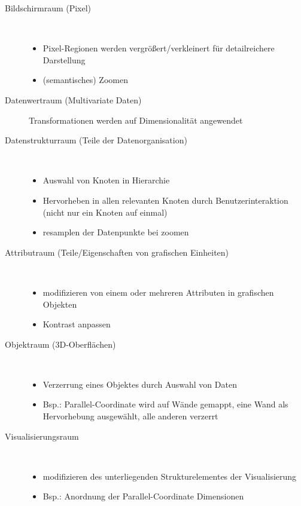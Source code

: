 \begin{description}
	\item[Bildschirmraum (Pixel)] \ \\\vspace*{-\baselineskip}
		\begin{itemize}
			\item Pixel-Regionen werden vergrößert/verkleinert für detailreichere Darstellung
			\item (semantisches) Zoomen
		\end{itemize}
	\item[Datenwertraum (Multivariate Daten)] Transformationen werden auf Dimensionalität angewendet
	\item[Datenstrukturraum (Teile der Datenorganisation)] \ \\\vspace*{-\baselineskip}
		\begin{itemize}
			\item Auswahl von Knoten in Hierarchie
			\item Hervorheben in allen relevanten Knoten durch Benutzerinteraktion (nicht nur ein Knoten auf einmal)
			\item resamplen der Datenpunkte bei zoomen
		\end{itemize}
	\item[Attributraum (Teile/Eigenschaften von grafischen Einheiten)] \ \\\vspace*{-\baselineskip}
		\begin{itemize}
			\item modifizieren von einem oder mehreren Attributen in grafischen Objekten
			\item Kontrast anpassen
		\end{itemize}
\end{description}
\topbreak
\vspace*{-\baselineskip}
\begin{description}
	\item[Objektraum (3D-Oberflächen)] \ \\\vspace*{-\baselineskip}
		\begin{itemize}
			\item Verzerrung eines Objektes durch Auswahl von Daten
			\item Bsp.: Parallel-Coordinate wird auf Wände gemappt, eine Wand als Hervorhebung ausgewählt, alle anderen verzerrt
		\end{itemize}
	\item[Visualisierungsraum] \ \\\vspace*{-\baselineskip}
		\begin{itemize}
			\item modifizieren des unterliegenden Strukturelementes der Visualisierung
			\item Bsp.: Anordnung der Parallel-Coordinate Dimensionen
		\end{itemize}
\end{description}